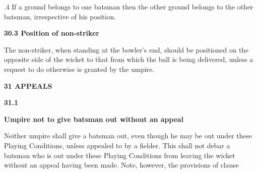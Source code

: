 \documentclass[12pt]{article}
\begin{document}
\vspace{\baselineskip}

\vspace{\baselineskip}
\begin{adjustwidth}{0.5in}{0.11in}
{\fontsize{9pt}{10.8pt}.4 \tabto{0.49in} If a ground belongs to one batsman then the other ground belongs to the other batsman, irrespective of his position.\par}\par

\end{adjustwidth}


\vspace{\baselineskip}
{\fontsize{11pt}{13.2pt}\selectfont \textbf{30.3 \tabto{0.47in} Position of non-striker}\par}\par


\vspace{\baselineskip}
\begin{adjustwidth}{0.0in}{0.22in}
{\fontsize{9pt}{10.8pt}\selectfont The non-striker, when standing at the bowler’s end, should be positioned on the opposite side of the wicket to that from which the ball is being delivered, unless a request to do otherwise is granted by the umpire.\par}\par

\end{adjustwidth}


\vspace{\baselineskip}
{\fontsize{16pt}{19.2pt}\selectfont \textbf{31 APPEALS}\par}\par


\vspace{\baselineskip}
{\fontsize{11pt}{13.2pt}\selectfont \textbf{31.1 \tabto{0.47in} }{\fontsize{10pt}{12.0pt}\selectfont \textbf{Umpire not to give batsman out without an appeal}\par}\par}\par


\vspace{\baselineskip}
\begin{adjustwidth}{0.0in}{0.12in}
{\fontsize{9pt}{10.8pt}\selectfont Neither umpire shall give a batsman out, even though he may be out under these Playing Conditions, unless appealed to by a fielder. This shall not debar a batsman who is out under these Playing Conditions from leaving the wicket without an appeal having been made. Note, however, the provisions of clause \par}\par

\end{adjustwidth}
\end{document}
